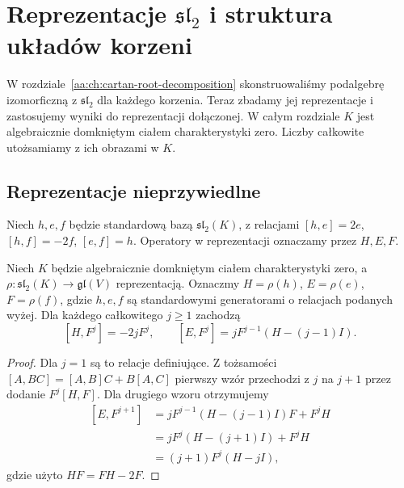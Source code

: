 \chapter[Reprezentacje sl2 i układy korzeni]{Reprezentacje \texorpdfstring{$\mathfrak{sl}_2$}{sl2} i struktura układów korzeni}
\label{aa:ch:sl2-root-systems}

\providecommand{\atlasref}[2]{#2}


W rozdziale~\ref{aa:ch:cartan-root-decomposition} skonstruowaliśmy podalgebrę izomorficzną z $\mathfrak{sl}_2$ dla każdego korzenia. Teraz zbadamy jej reprezentacje i zastosujemy wyniki do reprezentacji dołączonej. W całym rozdziale $K$ jest algebraicznie domkniętym ciałem charakterystyki zero. Liczby całkowite utożsamiamy z ich obrazami w $K$.

\section{Reprezentacje nieprzywiedlne}
Niech $h,e,f$ będzie standardową bazą $\mathfrak{sl}_2(K)$, z relacjami $[h,e]=2e$, $[h,f]=-2f$, $[e,f]=h$. Operatory w reprezentacji oznaczamy przez $H,E,F$.

\begin{lemat}
\label{aa:lem:sl2-commutation}
Niech $K$ będzie algebraicznie domkniętym ciałem charakterystyki zero, a $\rho:\mathfrak{sl}_2(K)\to\mathfrak{gl}(V)$ reprezentacją. Oznaczmy $H=\rho(h)$, $E=\rho(e)$, $F=\rho(f)$, gdzie $h,e,f$ są standardowymi generatorami o relacjach podanych wyżej. Dla każdego całkowitego $j\ge1$ zachodzą
\[
 [H,F^j]=-2jF^j,\qquad [E,F^j]=jF^{j-1}(H-(j-1)I).
\]
\end{lemat}
\begin{proof}
Dla $j=1$ są to relacje definiujące. Z tożsamości $[A,BC]=[A,B]C+B[A,C]$ pierwszy wzór przechodzi z $j$ na $j+1$ przez dodanie $F^j[H,F]$. Dla drugiego wzoru otrzymujemy
\[
\begin{aligned}
 [E,F^{j+1}]&=jF^{j-1}(H-(j-1)I)F+F^jH\\
 &=jF^j(H-(j+1)I)+F^jH\\
 &=(j+1)F^j(H-jI),
\end{aligned}
\]
gdzie użyto $HF=FH-2F$.
\end{proof}

